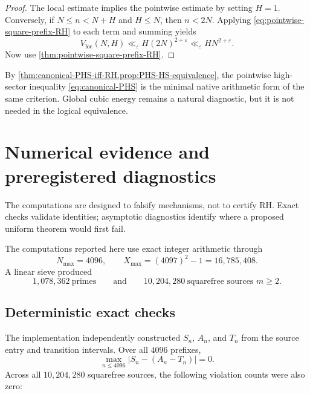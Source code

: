 \documentclass[11pt]{article}
\theoremstyle{definition}
\newcommand{\eps}{\varepsilon}
\newcommand{\1}{\mathbf{1}}
\begin{document}
\begin{proof}
The local estimate implies the pointwise estimate by setting $H=1$.  Conversely, if $N\le n<N+H$ and $H\le N$, then $n<2N$.  Applying \cref{eq:pointwise-square-prefix-RH} to each term and summing yields
\[
 V_{\mathrm{loc}}(N,H)
 \ll_\eps H(2N)^{2+\eps}
 \ll_\eps HN^{2+\eps}.
\]
Now use \cref{thm:pointwise-square-prefix-RH}.
\end{proof}

By \cref{thm:canonical-PHS-iff-RH,prop:PHS-HS-equivalence}, the pointwise high-sector inequality \cref{eq:canonical-PHS} is the minimal native arithmetic form of the same criterion.  Global cubic energy remains a natural diagnostic, but it is not needed in the logical equivalence.


\section{Numerical evidence and preregistered diagnostics}
\label{sec:numerics}

The computations are designed to falsify mechanisms, not to certify RH.  Exact checks validate identities; asymptotic diagnostics identify where a proposed uniform theorem would first fail.

The computations reported here use exact integer arithmetic through
\begin{equation}
 N_{\max}=4096,
 \qquad
 X_{\max}=(4097)^2-1=16{,}785{,}408.
 \label{eq:numerical-range}
\end{equation}
A linear sieve produced
\begin{equation}
 1{,}078{,}362\ \text{primes}
 \qquad\text{and}\qquad
 10{,}204{,}280\ \text{squarefree sources }m\ge2.
 \label{eq:numerical-counts}
\end{equation}

\subsection{Deterministic exact checks}

The implementation independently constructed $S_n$, $A_n$, and $T_n$ from the source entry and transition intervals.  Over all $4096$ prefixes,
\begin{equation}
 \max_{n\le4096}|S_n-(A_n-T_n)|=0.
 \label{eq:exact-AT-numerical}
\end{equation}
Across all $10{,}204{,}280$ squarefree sources, the following violation counts were also zero:
\end{document}
